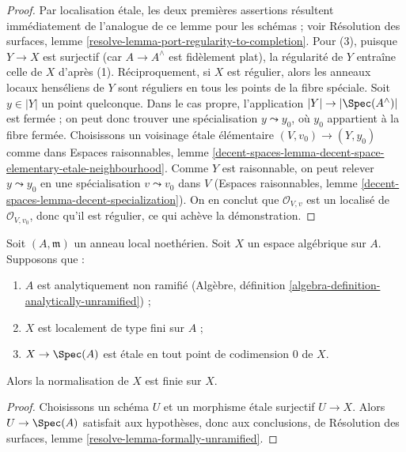 \begin{proof}
Par localisation étale, les deux premières assertions résultent immédiatement
de l'analogue de ce lemme pour les schémas ; voir Résolution des surfaces,
lemme \ref{resolve-lemma-port-regularity-to-completion}.
Pour (3), puisque $Y \to X$ est surjectif (car $A \to A^\wedge$ est
fidèlement plat), la régularité de $Y$ entraîne celle de $X$ d'après (1).
Réciproquement, si $X$ est régulier, alors les anneaux locaux henséliens de
$Y$ sont réguliers en tous les points de la fibre spéciale.
Soit $y \in |Y|$ un point quelconque.
Dans le cas propre, l'application $|Y| \to |\Spec(A^\wedge)|$ est fermée ;
on peut donc trouver une spécialisation $y \leadsto y_0$, où $y_0$ appartient
à la fibre fermée. Choisissons un voisinage étale élémentaire
$(V, v_0) \to (Y, y_0)$ comme dans Espaces raisonnables, lemme
\ref{decent-spaces-lemma-decent-space-elementary-etale-neighbourhood}.
Comme $Y$ est raisonnable, on peut relever $y \leadsto y_0$ en une
spécialisation $v \leadsto v_0$ dans $V$ (Espaces raisonnables, lemme
\ref{decent-spaces-lemma-decent-specialization}).
On en conclut que $\mathcal{O}_{V, v}$ est un localisé de
$\mathcal{O}_{V, v_0}$, donc qu'il est régulier, ce qui achève la démonstration.
\end{proof}

\begin{lemma}
\label{lemma-formally-unramified}
Soit $(A, \mathfrak m)$ un anneau local noethérien. Soit $X$ un espace
algébrique sur $A$. Supposons que :
\begin{enumerate}
\item $A$ est analytiquement non ramifié
(Algèbre, définition \ref{algebra-definition-analytically-unramified}) ;
\item $X$ est localement de type fini sur $A$ ;
\item $X \to \Spec(A)$ est étale en tout point de codimension $0$ de $X$.
\end{enumerate}
Alors la normalisation de $X$ est finie sur $X$.
\end{lemma}

\begin{proof}
Choisissons un schéma $U$ et un morphisme étale surjectif $U \to X$.
Alors $U \to \Spec(A)$ satisfait aux hypothèses, donc aux conclusions, de
Résolution des surfaces, lemme \ref{resolve-lemma-formally-unramified}.
\end{proof}











